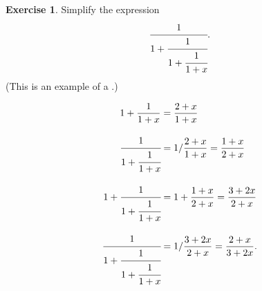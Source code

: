 \documentclass[a4paper]{book}
\theoremstyle{definition}
\newtheorem{exercise}[theorem]{Exercise}
\renewenvironment{solution}{\SolutionInline}{\endSolutionInline}
\begin{document}
\begin{exercise}
 Simplify the expression
 \[ \cfrac{1}{1+ \cfrac{1}{1+ \cfrac{1}{1+x}}}. \]
 (This is an example of a 
 .)
\end{exercise}
\begin{solution}
 \begin{align*}
  1+\frac{1}{1+x} &= \frac{2+x}{1+x} \\[2ex]
  \cfrac{1}{1+\cfrac{1}{1+x}} &= 
   1/\frac{2+x}{1+x} = \frac{1+x}{2+x} \\[2ex]
  1+\cfrac{1}{1+\cfrac{1}{1+x}} &= 
   1+\frac{1+x}{2+x} = \frac{3+2x}{2+x} \\[2ex]
  \cfrac{1}{1+\cfrac{1}{1+\cfrac{1}{1+x}}} &= 
   1/\frac{3+2x}{2+x} = \frac{2+x}{3+2x}.
 \end{align*}
\end{solution}
\end{document}

